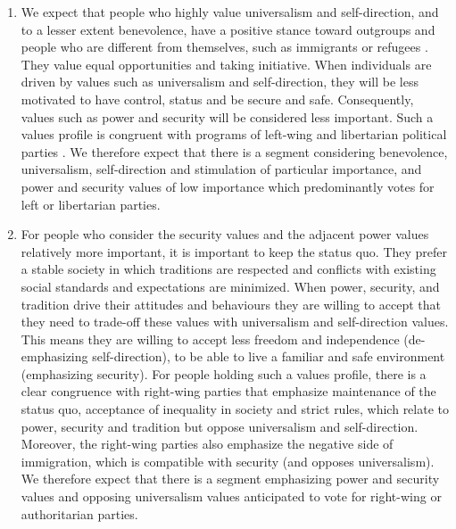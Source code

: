 \documentclass[12pt,letter]{article}\usepackage[]{graphicx}\usepackage[]{xcolor}
\begin{document}
\begin{enumerate}
\item We expect that people who highly value universalism and self-direction, and to a lesser extent benevolence, have a positive stance toward outgroups and people who are different from themselves, such as immigrants or refugees \citep{davidov2008,schwartz2010}. They value equal opportunities and taking initiative. When individuals are driven by values such as universalism and self-direction, they will be less motivated to have control, status and be secure and safe. Consequently, values such as power and security will be considered less important. Such a values profile is congruent with programs of left-wing and libertarian political parties \citep{caprara2006}. We therefore expect that there is a segment considering benevolence, universalism, self-direction and stimulation of particular importance, and power and security values of low importance which predominantly votes for left or libertarian parties. 

\item For people who consider the security values and the adjacent power values relatively more important, it is important to keep the status quo. They prefer a stable society in which traditions are respected and conflicts with existing social standards and expectations are minimized. When power, security, and tradition drive their attitudes and behaviours they are willing to accept that they need to trade-off these values with universalism and self-direction values. This means they are willing to accept less freedom and independence (de-emphasizing self-direction), to be able to live a familiar and safe environment (emphasizing security). For people holding such a values profile, there is a clear congruence with right-wing parties that emphasize maintenance of the status quo, acceptance of inequality in society and strict rules, which relate to power, security and tradition but oppose universalism and self-direction. Moreover, the right-wing parties also emphasize the negative side of immigration, which is compatible with security (and opposes universalism). We therefore expect that there is a segment emphasizing power and security values and opposing universalism values anticipated to vote for right-wing or authoritarian parties.


\end{enumerate}
\end{document}
